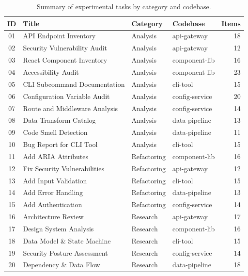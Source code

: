 \begin{table}[h]
\centering
\caption{Summary of experimental tasks by category and codebase.}
\label{tab:task-summary}
\small
\begin{tabular}{clllr}
\toprule
ID & Title & Category & Codebase & Items \\
\midrule
01 & API Endpoint Inventory & Analysis & api-gateway & 18 \\
02 & Security Vulnerability Audit & Analysis & api-gateway & 12 \\
03 & React Component Inventory & Analysis & component-lib & 16 \\
04 & Accessibility Audit & Analysis & component-lib & 23 \\
05 & CLI Subcommand Documentation & Analysis & cli-tool & 15 \\
06 & Configuration Variable Audit & Analysis & config-service & 20 \\
07 & Route and Middleware Analysis & Analysis & config-service & 14 \\
08 & Data Transform Catalog & Analysis & data-pipeline & 13 \\
09 & Code Smell Detection & Analysis & data-pipeline & 11 \\
10 & Bug Report for CLI Tool & Analysis & cli-tool & 15 \\
\midrule
11 & Add ARIA Attributes & Refactoring & component-lib & 16 \\
12 & Fix Security Vulnerabilities & Refactoring & api-gateway & 12 \\
13 & Add Input Validation & Refactoring & cli-tool & 15 \\
14 & Add Error Handling & Refactoring & data-pipeline & 13 \\
15 & Add Authentication & Refactoring & config-service & 14 \\
\midrule
16 & Architecture Review & Research & api-gateway & 17 \\
17 & Design System Analysis & Research & component-lib & 16 \\
18 & Data Model \& State Machine & Research & cli-tool & 15 \\
19 & Security Posture Assessment & Research & config-service & 14 \\
20 & Dependency \& Data Flow & Research & data-pipeline & 18 \\
\bottomrule
\end{tabular}
\end{table}
